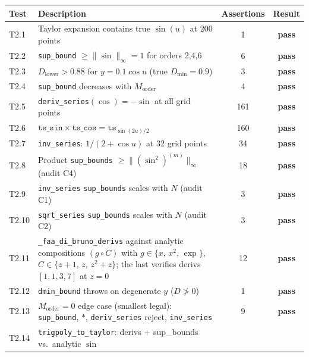 \documentclass[11pt]{article}
\theoremstyle{definition}
\begin{document}
\begin{table}[H]
\centering
\begin{tabular}{llcc}
\toprule
Test & Description & Assertions & Result \\
\midrule
T2.1  & Taylor expansion contains true $\sin(u)$ at 200 points & 1 & \textcolor{green!60!black}{\textbf{pass}} \\
T2.2  & \texttt{sup\_bound} $\ge \|\sin\|_\infty = 1$ for orders 2,4,6 & 6 & \textcolor{green!60!black}{\textbf{pass}} \\
T2.3  & $D_{\mathrm{lower}} > 0.88$ for $y = 0.1\cos u$ (true $D_{\min} = 0.9$) & 3 & \textcolor{green!60!black}{\textbf{pass}} \\
T2.4  & \texttt{sup\_bound} decreases with $M_{\mathrm{order}}$ & 4 & \textcolor{green!60!black}{\textbf{pass}} \\
T2.5  & \texttt{deriv\_series}$(\cos) = -\sin$ at all grid points & 161 & \textcolor{green!60!black}{\textbf{pass}} \\
T2.6  & $\texttt{ts\_sin} \times \texttt{ts\_cos} = \texttt{ts}_{\sin(2u)/2}$ & 160 & \textcolor{green!60!black}{\textbf{pass}} \\
T2.7  & \texttt{inv\_series}: $1/(2 + \cos u)$ at 32 grid points & 34 & \textcolor{green!60!black}{\textbf{pass}} \\
T2.8  & Product \texttt{sup\_bounds} $\ge \|(\sin^2)^{(m)}\|_\infty$ (audit C4) & 18 & \textcolor{green!60!black}{\textbf{pass}} \\
T2.9  & \texttt{inv\_series} \texttt{sup\_bounds} scales with $N$ (audit C1) & 3 & \textcolor{green!60!black}{\textbf{pass}} \\
T2.10 & \texttt{sqrt\_series} \texttt{sup\_bounds} scales with $N$ (audit C2) & 3 & \textcolor{green!60!black}{\textbf{pass}} \\
T2.11 & \texttt{\_faa\_di\_bruno\_derivs} against analytic compositions
        $(g\circ C)$ with $g \in \{x,\,x^2,\,\exp\}$, $C \in \{z+1,\,z,\,z^2+z\}$;
        the last verifies derivs $[1,1,3,7]$ at $z=0$ & 12 & \textcolor{green!60!black}{\textbf{pass}} \\
T2.12 & \texttt{dmin\_bound} throws on degenerate $y$ ($D \not> 0$) & 1 & \textcolor{green!60!black}{\textbf{pass}} \\
T2.13 & $M_{\mathrm{order}} = 0$ edge case (smallest legal):
        \texttt{sup\_bound}, $*$, \texttt{deriv\_series} reject, \texttt{inv\_series} & 9 & \textcolor{green!60!black}{\textbf{pass}} \\
T2.14 & \texttt{trigpoly\_to\_taylor}: derivs + sup\_bounds vs.\ analytic $\sin$

\end{tabular}
\end{table}
\end{document}
